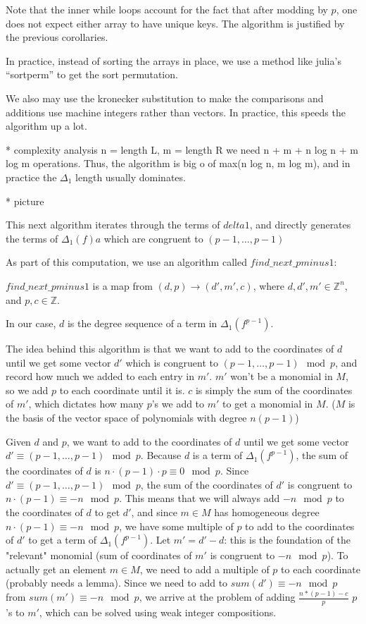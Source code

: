 Note that the inner while loops account for the fact that
after modding by \(p\), one does not expect 
either array to have unique keys.
The algorithm is justified by the previous corollaries.

In practice, instead of sorting the arrays in place, 
we use a method like julia's ``sortperm''
to get the sort permutation.

We also may use the kronecker substitution to make
the comparisons and additions use machine integers
rather than vectors.
In practice, this speeds the algorithm up a lot.

* complexity analysis
n = length L, m = length R
we need n + m + n log n + m log m operations.
Thus, the algorithm is big o of max(n log n, m log m),
and in practice the \(\Delta_{1}\) length
usually dominates.

* picture


This next algorithm iterates through the terms of $delta1$, and directly generates the terms of $\Delta_1(f)a$ which are congruent to $(p - 1, \dots, p - 1)$

As part of this computation, we use an algorithm called $find\_next\_pminus1$:

\begin{alg}
    $find\_next\_pminus1$ is a map from $(d, p) \rightarrow (d', m', c)$, where $d, d', m' \in \mathbb{Z}^n$, and $p, c \in \mathbb{Z}$.
\end{alg}

In our case, $d$ is the degree sequence of a term in $\Delta_{1}(f ^ {p - 1})$.

The idea behind this algorithm is that we want to add to the coordinates of $d$ until we get some vector $d'$ which is congruent to $(p - 1, \dots, p - 1) \mod p$, and record how much we added to each entry in $m'$. $m'$ won't be a monomial in $M$, so we add $p$ to each coordinate until it is. $c$ is simply the sum of the coordinates of $m'$, which dictates how many $p$'s we add to $m'$ to get a monomial in $M$. ($M$ is the basis of the vector space of polynomials with degree $n(p - 1)$)

Given $d$ and $p$, we want to add to the coordinates of $d$ until we get some vector $d' \equiv (p - 1, \dots, p - 1) \mod p$. Because $d$ is a term of $\Delta_{1}(f ^ {p - 1})$, the sum of the coordinates of $d$ is $n \cdot (p - 1) \cdot p \equiv 0 \mod p$. Since $d' \equiv (p - 1, \dots, p - 1) \mod p$, the sum of the coordinates of $d'$ is congruent to $n \cdot (p - 1) \equiv -n \mod p$. This means that we will always add $-n \mod p$ to the coordinates of $d$ to get $d'$, and since $m \in M$ has homogeneous degree $n \cdot (p - 1) \equiv -n \mod p$, we have some multiple of $p$ to add to the coordinates of $d'$ to get a term of $\Delta_{1}(f ^ {p - 1})$. Let $m' = d' - d$: this is the foundation of the "relevant" monomial (sum of coordinates of $m'$ is congruent to $-n \mod p$). To actually get an element $m \in M$, we need to add a multiple of $p$ to each coordinate (probably needs a lemma). Since we need to add to $sum(d') \equiv -n \mod p$ from $sum(m') \equiv -n \mod p$, we arrive at the problem of adding $\frac{n * (p - 1) - c}{p}$ $p$'s to $m'$, which can be solved using weak integer compositions.

